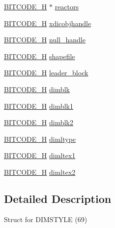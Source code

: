 \begin{DoxyCompactItemize}
\item 
\hyperlink{dwg_8h_a7c700e94e047a97ba8c24bdfe4029dc3}{\-B\-I\-T\-C\-O\-D\-E\-\_\-\-H} $\ast$ \hyperlink{struct__dwg__object__DIMSTYLE_ae38e72c24a20183aa763b37901f13419}{reactors}
\item 
\hyperlink{dwg_8h_a7c700e94e047a97ba8c24bdfe4029dc3}{\-B\-I\-T\-C\-O\-D\-E\-\_\-\-H} \hyperlink{struct__dwg__object__DIMSTYLE_a24dcf2a8e88a09aeda0fb7efc6540a1a}{xdicobjhandle}
\item 
\hyperlink{dwg_8h_a7c700e94e047a97ba8c24bdfe4029dc3}{\-B\-I\-T\-C\-O\-D\-E\-\_\-\-H} \hyperlink{struct__dwg__object__DIMSTYLE_a68b6a854083d68cbd56280174604b17f}{null\-\_\-handle}
\item 
\hyperlink{dwg_8h_a7c700e94e047a97ba8c24bdfe4029dc3}{\-B\-I\-T\-C\-O\-D\-E\-\_\-\-H} \hyperlink{struct__dwg__object__DIMSTYLE_a6f85b59741cc34904d5b879a021833d1}{shapefile}
\item 
\hyperlink{dwg_8h_a7c700e94e047a97ba8c24bdfe4029dc3}{\-B\-I\-T\-C\-O\-D\-E\-\_\-\-H} \hyperlink{struct__dwg__object__DIMSTYLE_a897816d530aa9bc049ea23be029379b2}{leader\-\_\-block}
\item 
\hyperlink{dwg_8h_a7c700e94e047a97ba8c24bdfe4029dc3}{\-B\-I\-T\-C\-O\-D\-E\-\_\-\-H} \hyperlink{struct__dwg__object__DIMSTYLE_ac2c1cf1814dd79b1fae9a875a49b4cd8}{dimblk}
\item 
\hyperlink{dwg_8h_a7c700e94e047a97ba8c24bdfe4029dc3}{\-B\-I\-T\-C\-O\-D\-E\-\_\-\-H} \hyperlink{struct__dwg__object__DIMSTYLE_a666ddd2b6a1fdd39ab949f3d9a6289d9}{dimblk1}
\item 
\hyperlink{dwg_8h_a7c700e94e047a97ba8c24bdfe4029dc3}{\-B\-I\-T\-C\-O\-D\-E\-\_\-\-H} \hyperlink{struct__dwg__object__DIMSTYLE_ac759b7477426db5088ea527baab264a7}{dimblk2}
\item 
\hyperlink{dwg_8h_a7c700e94e047a97ba8c24bdfe4029dc3}{\-B\-I\-T\-C\-O\-D\-E\-\_\-\-H} \hyperlink{struct__dwg__object__DIMSTYLE_a8d3918f869606bf1cfa0d5a552c13840}{dimltype}
\item 
\hyperlink{dwg_8h_a7c700e94e047a97ba8c24bdfe4029dc3}{\-B\-I\-T\-C\-O\-D\-E\-\_\-\-H} \hyperlink{struct__dwg__object__DIMSTYLE_a4a294f392a286609c7826209b2b04741}{dimltex1}
\item 
\hyperlink{dwg_8h_a7c700e94e047a97ba8c24bdfe4029dc3}{\-B\-I\-T\-C\-O\-D\-E\-\_\-\-H} \hyperlink{struct__dwg__object__DIMSTYLE_a6d767541f0efd729f551ff55aa8c42de}{dimltex2}
\end{DoxyCompactItemize}


\subsection{\-Detailed \-Description}
\-Struct for \-D\-I\-M\-S\-T\-Y\-L\-E (69) 

